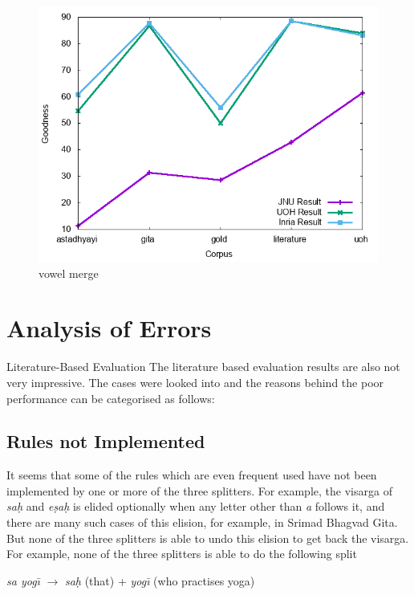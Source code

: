 \documentclass[11pt]{article}
\begin{document}
\begin{figure}[h]
	\center
	\includegraphics[scale=0.34]{images/vowelmerge.png}
	\caption{\label{screen}vowel merge}
\end{figure}




\section{Analysis of Errors}
 Literature-Based Evaluation
The literature based evaluation results are also not very impressive. The cases were looked into and the reasons behind the poor performance can be categorised as follows:


\subsection{Rules not Implemented}
      It seems that some of the rules which are even frequent used have not been implemented by one or more of the three splitters. For example, the visarga of \textit{sa\d{h}} and \textit{e\d{s}a\d{h}} is elided optionally when any letter other than \textit{a} follows it, and there are many such cases of this elision, for example, in Srimad Bhagvad Gita. But none of the three splitters is able to undo this elision to get back the visarga. For example, none of the three splitters is able to do the following split
      
                        \textit{sa yog\={\i}} $\rightarrow$ \textit{sa\d{h}} (that) + \textit{yog\={\i}} (who practises yoga)
                        
\end{document}

